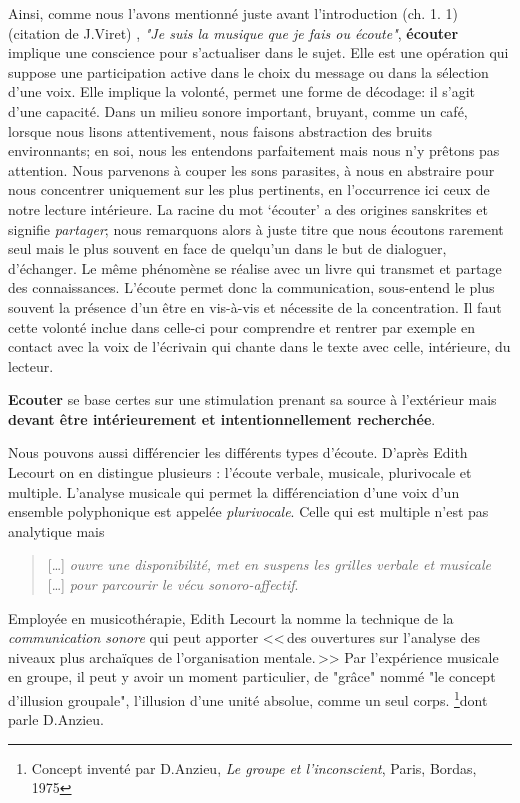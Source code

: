 Ainsi, comme nous l'avons mentionné juste avant l'introduction (ch. 1. 1) (citation de J.Viret) , \emph{"Je suis la musique que je fais ou écoute"}, \textbf{écouter} implique une conscience pour s'actualiser dans le sujet. Elle est une opération qui suppose une participation active dans le choix du message
ou dans la sélection d'une voix. Elle  implique la volonté,
permet une forme de décodage: il s'agit d'une capacité. Dans un milieu sonore important, bruyant, comme un café, lorsque nous lisons attentivement, nous faisons abstraction
des bruits environnants; en soi, nous les entendons parfaitement mais nous n'y
prêtons pas attention. Nous parvenons à couper les sons parasites, à nous en abstraire pour
nous concentrer uniquement sur les plus  pertinents, en l'occurrence ici ceux de notre lecture intérieure.
 La racine du mot `écouter' a des origines sanskrites et signifie \emph{partager}; nous remarquons alors à juste titre que nous écoutons rarement seul mais  le plus souvent en face de quelqu'un dans le but de dialoguer, d'échanger. Le même phénomène se réalise avec un livre qui transmet et partage des connaissances. L'écoute permet donc la communication, sous-entend le plus souvent la présence d'un être en vis-à-vis et nécessite de la  concentration. Il faut cette volonté inclue dans celle-ci  pour comprendre et rentrer par exemple en contact avec la voix de  l'écrivain qui chante dans le texte avec celle, intérieure,  du lecteur.
 
 
 \textbf{Ecouter} se base certes sur une stimulation prenant sa source à 
l'extérieur mais \textbf{devant être intérieurement et  intentionnellement
	recherchée}.




Nous pouvons aussi différencier les différents types d'écoute. D'après Edith Lecourt \autocite[ch. 10 <<\,De l'écoute verbale à l'écoute musicale\,>>, p. 182.]{lecourt:decouvrir}
 on en distingue plusieurs : l'écoute verbale, musicale, plurivocale et multiple.
 L'analyse musicale qui permet la différenciation d'une voix d'un ensemble polyphonique est appelée \emph{plurivocale}. Celle qui est multiple n'est pas analytique  mais 
 \begin{quote}
 	 [\ldots] \textit{ouvre une disponibilité, met en suspens les grilles verbale et musicale} [\ldots] \emph{pour parcourir le vécu sonoro-affectif}\autocite[p. 183]{lecourt:decouvrir}.
 \end{quote}
 Employée en musicothérapie, Edith Lecourt la nomme  la technique de la  \emph{communication sonore} qui peut apporter 
 <<\,des ouvertures sur l'analyse des niveaux plus archaïques de l'organisation mentale.\,>>\autocite[p. 154]{lecourt:decouvrir}	
 Par l'expérience musicale en groupe, il peut y avoir un moment particulier, de "grâce"  nommé "le concept d'illusion groupale", l'illusion d'une unité absolue, comme un seul corps. \footnote{Concept inventé par D.Anzieu, \textit{Le groupe et l'inconscient}, Paris, Bordas, 1975 }dont parle D.Anzieu.

